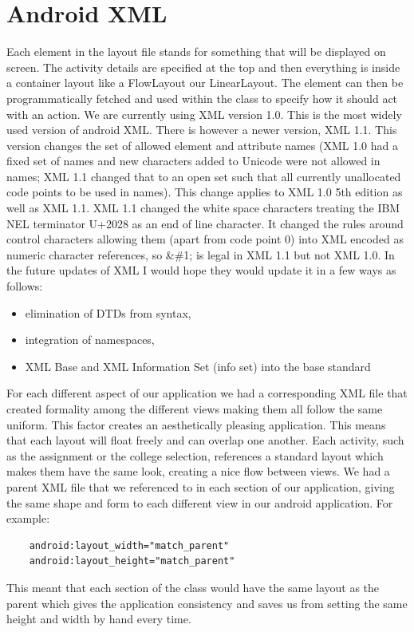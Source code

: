 \pagebreak
\section{Android XML}
Each element in the layout file stands for something that will be displayed on screen. The activity details are specified at the top and then everything is inside a container layout like a FlowLayout our LinearLayout. The element can then be programmatically fetched and used within the class to specify how it should act with an action. We are currently using XML version 1.0. This is the most widely used version of android XML. There is however a newer version, XML 1.1. This version changes the set of allowed element and attribute names (XML 1.0 had a fixed set of names and new characters added to Unicode were not allowed in names; XML 1.1 changed that to an open set such that all currently unallocated code points to be used in names). This change applies to XML 1.0 5th edition as well as XML 1.1. XML 1.1 changed the white space characters treating the IBM NEL terminator U+2028 as an end of line character. It changed the rules around control characters allowing them (apart from code point 0) into XML encoded as numeric character references, so \&\#1; is legal in XML 1.1 but not XML 1.0. In the future updates of XML I would hope they would update it in a few ways as follows:
\begin{itemize}
\item elimination of DTDs from syntax,
\item integration of namespaces,
\item XML Base and XML Information Set (info set) into the base standard
\end{itemize}
For each different aspect of our application we had a corresponding XML file that created formality among the different views making them all follow the same uniform. This factor creates an aesthetically pleasing application. This means that each layout will float freely and can overlap one another. Each activity, such as the assignment or the college selection, references a standard layout which makes them have the same look, creating a nice flow between views.  We had a parent XML file that we referenced to in each section of our application, giving the same shape and form to each different view in our android application. For example:
\begin{verbatim}
	android:layout_width="match_parent"
	android:layout_height="match_parent"
\end{verbatim}
This meant that each section of the class would have the same layout as the parent which gives the application consistency and saves us from setting the same height and width by hand every time.

